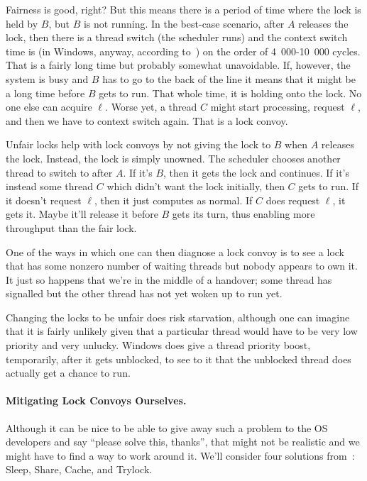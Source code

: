 \documentclass[a4paper]{report}
\begin{document}
Fairness is good, right? But this means there is a period of time where the lock is held by $B$, but $B$ is not running. In the best-case scenario, after $A$ releases the lock, then there is a thread switch (the scheduler runs) and the context switch time is (in Windows, anyway, according to~\cite{anticonvoy}) on the order of 4~000-10~000 cycles. That is a fairly long time but probably somewhat unavoidable. If, however, the system is busy and $B$ has to go to the back of the line it means that it might be a long time before $B$ gets to run. That whole time, it is holding onto the lock. No one else can acquire $\ell$. Worse yet, a thread $C$ might start processing, request $\ell$, and then we have to context switch again. That is a lock convoy.

Unfair locks help with lock convoys by not giving the lock to $B$ when $A$ releases the lock. Instead, the lock is simply unowned. The scheduler chooses another thread to switch to after $A$. If it's $B$, then it gets the lock and continues. If it's instead some thread $C$ which didn't want the lock initially, then $C$ gets to run. If it doesn't request $\ell$, then it just computes as normal. If $C$ does request $\ell$, it gets it. Maybe it'll release it before $B$ gets its turn, thus enabling more throughput than the fair lock.

One of the ways in which one can then diagnose a lock convoy is to see a lock that has some nonzero number of waiting threads but nobody appears to own it. It just so happens that we're in the middle of a handover; some thread has signalled but the other thread has not yet woken up to run yet.

Changing the locks to be unfair does risk starvation, although one can imagine that it is fairly unlikely given that a particular thread would have to be very low priority and very unlucky. Windows does give a thread priority boost, temporarily, after it gets unblocked, to see to it that the unblocked thread does actually get a chance to run.

\paragraph{Mitigating Lock Convoys Ourselves.} Although it can be nice to be able to give away such a problem to the OS developers and say ``please solve this, thanks'', that might not be realistic and we might have to find a way to work around it. We'll consider four solutions from~\cite{lockconvoys}: Sleep, Share, Cache, and Trylock.
\end{document}
